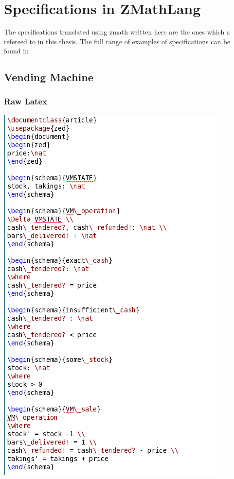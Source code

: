 \chapter{Specifications in ZMathLang}
\label{app:other}

The specifications translated using \gls{zmath} written here are the ones which a refereed to in this thesis. The full range of examples of specifications can be found in \cite{mathlangexamples}.

\section{Vending Machine}
\label{app:vm}

\subsection{Raw Latex}
\label{app:vm0}
%
\includegraphics[scale=0.5]{examples/vm/0imagea.png}

